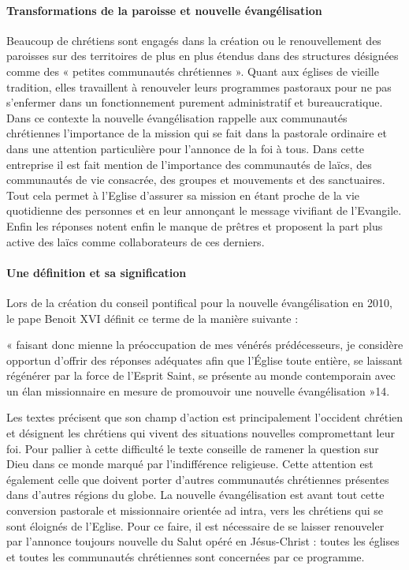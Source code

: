 \paragraph{Transformations de la paroisse et nouvelle évangélisation}
Beaucoup de chrétiens sont engagés dans la création ou le renouvellement des paroisses sur des
territoires de plus en plus étendus dans des structures désignées comme des « petites communautés
chrétiennes ». Quant aux églises de vieille tradition, elles travaillent à renouveler leurs programmes
pastoraux pour ne pas s’enfermer dans un fonctionnement purement administratif et bureaucratique.
Dans ce contexte la nouvelle évangélisation rappelle aux communautés chrétiennes l’importance de
la mission qui se fait dans la pastorale ordinaire et dans une attention particulière pour l’annonce de
la foi à tous. Dans cette entreprise il est fait mention de l’importance des communautés de laïcs, des
communautés de vie consacrée, des groupes et mouvements et des sanctuaires. Tout cela permet à
l’Eglise d’assurer sa mission en étant proche de la vie quotidienne des personnes et en leur annonçant
le message vivifiant de l’Evangile. Enfin les réponses notent enfin le manque de prêtres et proposent
la part plus active des laïcs comme collaborateurs de ces derniers.
\paragraph{Une définition et sa signification}
Lors de la création du conseil pontifical pour la nouvelle évangélisation en 2010, le pape Benoit XVI
définit ce terme de la manière suivante : 
\begin{Def}
    « faisant donc mienne la préoccupation de mes vénérés 
prédécesseurs, je considère opportun d’offrir des réponses adéquates afin que l’Église toute entière,
se laissant régénérer par la force de l’Esprit Saint, se présente au monde contemporain avec un élan
missionnaire en mesure de promouvoir une nouvelle évangélisation »14. 
\end{Def}

 Les textes précisent que son
champ d’action est principalement l’occident chrétien et désignent les chrétiens qui vivent des
situations nouvelles compromettant leur foi. Pour pallier à cette difficulté le texte conseille de ramener
la question sur Dieu dans ce monde marqué par l’indifférence religieuse. Cette attention est également
celle que doivent porter d’autres communautés chrétiennes présentes dans d’autres régions du globe.
La nouvelle évangélisation est avant tout cette conversion pastorale et missionnaire orientée ad intra,
vers les chrétiens qui se sont éloignés de l’Eglise. Pour ce faire, il est nécessaire de se laisser
renouveler par l’annonce toujours nouvelle du Salut opéré en Jésus-Christ : toutes les églises et toutes
les communautés chrétiennes sont concernées par ce programme.
